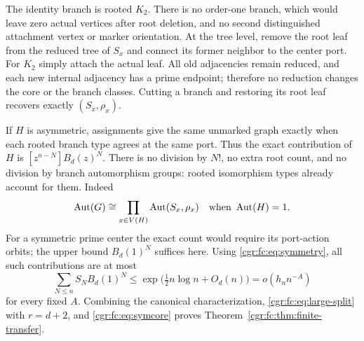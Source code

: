 \documentclass[11pt,letterpaper]{article}
\numberwithin{equation}{section}
\theoremstyle{definition}\newtheorem{definition}[theorem]{Definition}
\theoremstyle{remark}\newtheorem{remark}[theorem]{Remark}
\DeclareMathOperator{\Aut}{Aut}
\begin{document}
The identity branch is rooted $K_2$. There is no order-one branch,
which would leave zero actual vertices after root deletion, and no
second distinguished attachment vertex or marker orientation.
At the tree level, remove the root leaf from the reduced tree of
$S_x$ and connect its former neighbor to the center port. For
$K_2$ simply attach the actual leaf. All old adjacencies remain
reduced, and each new internal adjacency has a prime endpoint;
therefore no reduction changes the core or the branch classes.
Cutting a branch and restoring its root leaf recovers exactly
$(S_x,\rho_x)$.

If $H$ is asymmetric, assignments give the same unmarked graph
exactly when each rooted branch type agrees at the same port.
Thus the exact contribution of $H$ is $[z^{n-N}]B_d(z)^N$.
There is no division by $N!$, no extra root count, and no division
by branch automorphism groups: rooted isomorphism types already
account for them. Indeed
\[
 \Aut(G)\cong\prod_{x\in V(H)}\Aut(S_x,\rho_x)
 \quad\hbox{when }\Aut(H)=1.
\]
For a symmetric prime center the exact count would require its
port-action orbits; the upper bound $B_d(1)^N$ suffices here.
Using \eqref{cgr:fc:eq:symmetry}, all such contributions are at most
\begin{equation}\label{cgr:fc:eq:symcore}
 \sum_{N\le n}S_N B_d(1)^N
 \le\exp\bigl(\tfrac12 n\log n+O_d(n)\bigr)
 =o(h_n n^{-A})
\end{equation}
for every fixed $A$. Combining the canonical characterization,
\eqref{cgr:fc:eq:large-split} with $r=d+2$, and \eqref{cgr:fc:eq:symcore}
proves Theorem~\ref{cgr:fc:thm:finite-transfer}.
\end{document}
